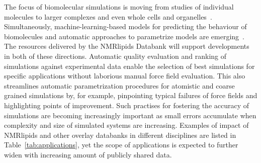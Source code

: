 \documentclass[fleqn,10pt]{wlscirep}
\begin{document}
The focus of biomolecular simulations is moving from studies of individual molecules to larger complexes and even whole cells and organelles~\cite{johnson15,thornburg22,gupta22}. Simultaneously, machine-learning-based models for predicting the behaviour of biomolecules and automatic approaches to parametrize models are emerging~\cite{jumper21,antila22b}. The resources delivered by the NMRlipids Databank will support developments in both of these directions. Automatic quality evaluation and ranking of simulations against experimental data enable the selection of best simulations for specific applications without laborious manual force field evaluation. This also streamlines automatic parametrization procedures for atomistic and coarse grained simulations by, for example, pinpointing typical failures of force fields and highlighting points of improvement. Such practises for fostering the accuracy of simulations are becoming increasingly important as small errors accumulate when complexity and size of simulated systems are increasing. Examples of impact of NMRlipids and other overlay databanks in different disciplines are listed in Table~\ref{tab:applications}, yet the scope of applications is expected to further widen with increasing amount of publicly shared data.  
\end{document}
